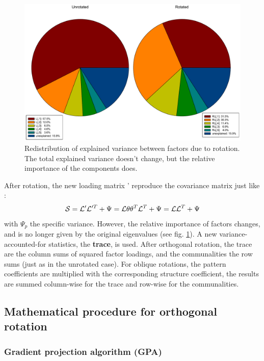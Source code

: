 \begin{figure}
 \caption{Redistribution of explained variance between factors due to rotation. The total explained variance doesn't change, but the relative importance of the components does. }
 \label{fig:trace}
 \centering
 \includegraphics[width=\textwidth]{Graphics/Effect-rotation}
\end{figure}

After rotation, the new loading matrix ' reproduce the covariance matrix just like :
\begin{equation}
  \mathcal{S} = \mathcal{L}'\mathcal{L}'^T + \Psi = \mathcal{L}\theta\theta^T\mathcal{L}^T  + \Psi = \mathcal{L}\mathcal{L}^T  + \Psi
\end{equation}
with \(\Psi_p \) the specific variance. However, the relative importance of factors changes, and is no longer given by the original eigenvalues (see fig. \ref{fig:trace}). A new variance-accounted-for statistics, the \textbf{trace}, is used. After orthogonal rotation, the trace are the column sums of squared factor loadings, and the communalities the row sums (just as in the unrotated case). For oblique rotations, the pattern coefficients are multiplied with the corresponding structure coefficient, the results are summed column-wise for the trace and row-wise for the communalities.

\subsection{Mathematical procedure for orthogonal rotation}

\subsubsection{Gradient projection algorithm (GPA)}\label{text:GPA}

